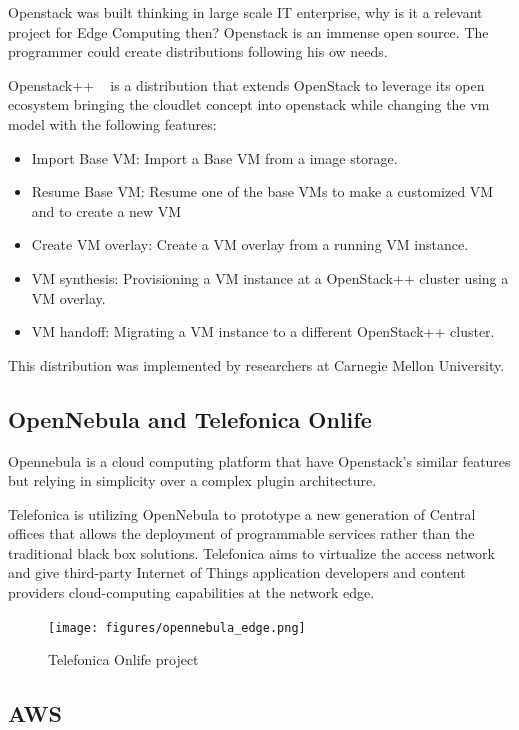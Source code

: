 Openstack was built thinking in large scale IT enterprise, why is it a relevant project for Edge Computing then? Openstack is an immense open source. The programmer could create distributions following his ow needs.

Openstack++ ~\cite{Cloudlet:2015} is a distribution that extends OpenStack to leverage its open ecosystem bringing the cloudlet concept into openstack while changing the vm model with the following features:

\begin{itemize}
    \item Import Base VM: Import a Base VM from a image storage.
    \item Resume Base VM: Resume one of the base VMs to make a customized VM and to create a new VM
    \item Create VM overlay: Create a VM overlay from a running VM instance.
    \item VM synthesis: Provisioning a VM instance at a OpenStack++ cluster using a VM overlay.
    \item VM handoff: Migrating a VM instance to a different OpenStack++ cluster.
\end{itemize}

This distribution was implemented by researchers at Carnegie Mellon University.
\newpage
\subsection{OpenNebula and Telefonica Onlife}
\label{makereference2.3.2}

Opennebula is a cloud computing platform that have Openstack's similar features but relying in simplicity over a complex plugin architecture.

Telefonica is utilizing OpenNebula to prototype a new generation of Central offices that allows the deployment of programmable services rather than the traditional black box solutions. Telefonica aims to virtualize the access network and give third-party Internet of Things application developers and content providers cloud-computing capabilities at the network edge.~\cite{IEC:Opennebula:2017}

\begin{figure}[h]%
    \texttt{[image: figures/opennebula\_edge.png]}
~\caption{Telefonica Onlife project}
\label{figure2.3}
\end{figure}

\newpage
\subsection{AWS}
\label{makereference2.3.3}

